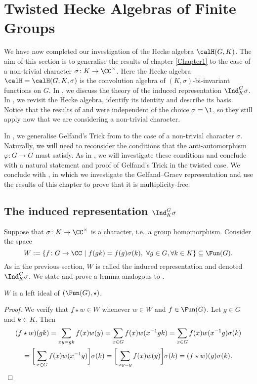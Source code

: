 \section{Twisted Hecke Algebras of Finite Groups}\label{Chapter2}
We have now completed our investigation of the Hecke algebra $\calH(G,K)$.
The aim of this section is to generalise the results of chapter \ref{Chapter1} to the case of a non-trivial character $\sigma\colon K\to\CC^\times$.
Here the Hecke algebra $\calH=\calH(G,K,\sigma)$ is the convolution algebra of $(K,\sigma)$-bi-invariant functions on $G$.
In , we discuss the theory of the induced representation $\Ind_K^G \sigma$.
In , we revisit the Hecke algebra, identify its identity and describe its basis.
Notice that the results of  and  were independent of the choice $\sigma=\1$, so they still apply now that we are considering a non-trivial character.

In , we generalise Gelfand's Trick from  to the case of a non-trivial character $\sigma$.
Naturally, we will need to reconsider the conditions that the anti-automorphism $\varphi\colon G\to G$ must satisfy.
As in , we will investigate these conditions and conclude with a natural statement and proof of Gelfand's Trick in the twisted case.
We conclude with , in which we investigate the Gelfand--Graev representation and use the results of this chapter to prove that it is multiplicity-free.


\subsection{The induced representation $\Ind_K^G \sigma$}\label{Section2.1}
Suppose that $\sigma\colon K \to\CC^\times$ is a character, i.e.\ a group homomorphism.
Consider the space
\[
    W := \{f\colon G\to \CC\ |\ f(gk) = f(g)\sigma(k),\ \forall g\in G, \forall k \in K\} \subseteq \Fun(G).
\]
As in the previous section, $W$ is called the induced representation and denoted $\Ind_K^G \sigma$.
We state and prove a lemma analogous to .
\begin{lem}\label{lemma: W_left_ideal_two}
    $W$ is a left ideal of $(\Fun(G),\star)$.
\end{lem}
\begin{proof}
    We verify that $f\star w\in W$ whenever $w\in W$ and $f\in\Fun(G)$.
    Let $g\in G$ and $k\in K$.
    Then
    \begin{multline*}
        (f\star w)(gk) = \sum_{xy=gk} f(x)w(y) = \sum_{x\in G} f(x)w(x^{-1}gk) = \sum_{x\in G} f(x)w(x^{-1}g)\sigma(k) \\
        = \bigg[\sum_{x\in G} f(x)w(x^{-1}g)\bigg]\sigma(k) = \bigg[\sum_{xy=g} f(x)w(y)\bigg]\sigma(k) = (f\star w)(g)\sigma(k).\qedhere
    \end{multline*}
\end{proof}

